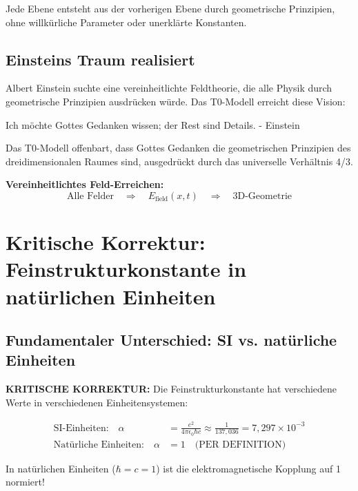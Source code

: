 \documentclass[12pt,a4paper]{report}
\begin{document}
	Jede Ebene entsteht aus der vorherigen Ebene durch geometrische Prinzipien, ohne willkürliche Parameter oder unerklärte Konstanten.
	
	\subsection{Einsteins Traum realisiert}
	\label{subsec:einstein_dream}
	
	Albert Einstein suchte eine vereinheitlichte Feldtheorie, die alle Physik durch geometrische Prinzipien ausdrücken würde. Das T0-Modell erreicht diese Vision:
	
	\begin{tcolorbox}[colback=green!5!white,colframe=green!75!black,title=Einsteins Vision realisiert]
		Ich möchte Gottes Gedanken wissen; der Rest sind Details. - Einstein
		
		Das T0-Modell offenbart, dass Gottes Gedanken die geometrischen Prinzipien des dreidimensionalen Raumes sind, ausgedrückt durch das universelle Verhältnis 4/3.
	\end{tcolorbox}
	
	\textbf{Vereinheitlichtes Feld-Erreichen:}
	\begin{equation}
		\text{Alle Felder} \quad \Rightarrow \quad E_{\text{field}}(x,t) \quad \Rightarrow \quad \text{3D-Geometrie}
	\end{equation}
	
	\section{Kritische Korrektur: Feinstrukturkonstante in natürlichen Einheiten}
	\label{sec:fine_structure_correction}
	
	\subsection{Fundamentaler Unterschied: SI vs. natürliche Einheiten}
	\label{subsec:si_vs_natural_units}
	
	\textbf{KRITISCHE KORREKTUR:} Die Feinstrukturkonstante hat verschiedene Werte in verschiedenen Einheitensystemen:
	
	\begin{tcolorbox}[colback=red!10!white,colframe=red!75!black,title=KRITISCHER PUNKT]
		\begin{align}
			\text{SI-Einheiten:} \quad \alpha &= \frac{e^2}{4\pi\epsilon_0\hbar c} \approx \frac{1}{137,036} = 7,297 \times 10^{-3} \\
			\text{Natürliche Einheiten:} \quad \alpha &= 1 \quad \text{(PER DEFINITION)}
		\end{align}
		
		In natürlichen Einheiten ($\hbar = c = 1$) ist die elektromagnetische Kopplung auf 1 normiert!
	\end{tcolorbox}
	
\end{document}
